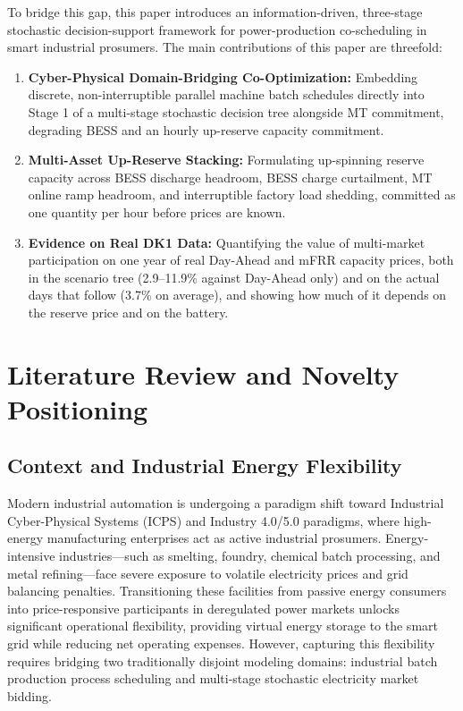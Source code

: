 \documentclass[journal]{IEEEtran}
\begin{document}
To bridge this gap, this paper introduces an information-driven, three-stage stochastic decision-support framework for power-production co-scheduling in smart industrial prosumers. The main contributions of this paper are threefold:
\begin{enumerate}
    \item \textbf{Cyber-Physical Domain-Bridging Co-Optimization:} Embedding discrete, non-interruptible parallel machine batch schedules directly into Stage 1 of a multi-stage stochastic decision tree alongside MT commitment, degrading BESS and an hourly up-reserve capacity commitment.
    \item \textbf{Multi-Asset Up-Reserve Stacking:} Formulating up-spinning reserve capacity across BESS discharge headroom, BESS charge curtailment, MT online ramp headroom, and interruptible factory load shedding, committed as one quantity per hour before prices are known.
    \item \textbf{Evidence on Real DK1 Data:} Quantifying the value of multi-market participation on one year of real Day-Ahead and mFRR capacity prices, both in the scenario tree (2.9--11.9\% against Day-Ahead only) and on the actual days that follow (3.7\% on average), and showing how much of it depends on the reserve price and on the battery.
\end{enumerate}
\section{Literature Review and Novelty Positioning}

\subsection{Context and Industrial Energy Flexibility}
Modern industrial automation is undergoing a paradigm shift toward Industrial Cyber-Physical Systems (ICPS) and Industry 4.0/5.0 paradigms, where high-energy manufacturing enterprises act as active industrial prosumers. Energy-intensive industries—such as smelting, foundry, chemical batch processing, and metal refining—face severe exposure to volatile electricity prices and grid balancing penalties. Transitioning these facilities from passive energy consumers into price-responsive participants in deregulated power markets unlocks significant operational flexibility, providing virtual energy storage to the smart grid while reducing net operating expenses. However, capturing this flexibility requires bridging two traditionally disjoint modeling domains: industrial batch production process scheduling and multi-stage stochastic electricity market bidding.
\end{document}
